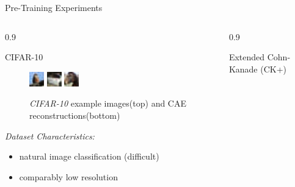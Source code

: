 \documentclass[final]{beamer}
\newlength{\onecolwid}
\newlength{\threecolwid}
\begin{document}
\begin{frame}[t]
\begin{columns}[t]
\begin{column}{\threecolwid}
\begin{alertblock}{Pre-Training Experiments}
\begin{columns}[t, totalwidth=0.9\threecolwid]
\begin{column}{0.9\onecolwid}
\begin{block}{CIFAR-10}
\begin{figure}
	\includegraphics[width=0.2\linewidth]{../graphics/reconstructions/cifar/reconstruction_00.png}
	\includegraphics[width=0.2\linewidth]{../graphics/reconstructions/cifar/reconstruction_01.png}
	\includegraphics[width=0.2\linewidth]{../graphics/reconstructions/cifar/reconstruction_02.png}

	\caption{\emph{CIFAR-10} example images(top) and CAE reconstructions(bottom)}

	\end{figure}

	\emph{Dataset Characteristics:}\\
	\begin{itemize}
	\item natural image classification (difficult)
	\item comparably low resolution
	\end{itemize}
	\end{block}
	\end{column}

	\begin{column}{0.9\onecolwid}
	\begin{block}{Extended Cohn-Kanade (CK+)}


\end{block}
\end{column}
\end{columns}
\end{alertblock}
\end{column}
\end{columns}
\end{frame}
\end{document}
